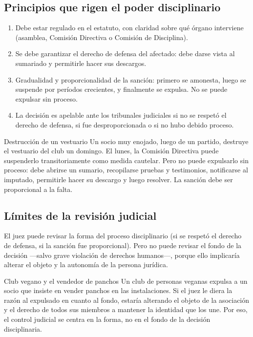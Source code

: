 \documentclass[12pt,oneside]{book}
\begin{document}
\subsection{Principios que rigen el poder disciplinario}

\begin{enumerate}
    \item Debe estar regulado en el estatuto, con claridad sobre qué órgano interviene (asamblea, Comisión Directiva o Comisión de Disciplina).
    \item Se debe garantizar el derecho de defensa del afectado: debe darse vista al sumariado y permitirle hacer sus descargos.
    \item Gradualidad y proporcionalidad de la sanción: primero se amonesta, luego se suspende por períodos crecientes, y finalmente se expulsa. No se puede expulsar sin proceso.
    \item La decisión es apelable ante los tribunales judiciales si no se respetó el derecho de defensa, si fue desproporcionada o si no hubo debido proceso.
\end{enumerate}

\begin{example}{Destrucción de un vestuario}
Un socio muy enojado, luego de un partido, destruye el vestuario del club un domingo. El lunes, la Comisión Directiva puede suspenderlo transitoriamente como medida cautelar. Pero no puede expulsarlo sin proceso: debe abrirse un sumario, recopilarse pruebas y testimonios, notificarse al imputado, permitirle hacer su descargo y luego resolver. La sanción debe ser proporcional a la falta.
\end{example}

\subsection{Límites de la revisión judicial}

El juez puede revisar la forma del proceso disciplinario (si se respetó el derecho de defensa, si la sanción fue proporcional). Pero no puede revisar el fondo de la decisión —salvo grave violación de derechos humanos—, porque ello implicaría alterar el objeto y la autonomía de la persona jurídica.

\begin{example}{Club vegano y el vendedor de panchos}
Un club de personas veganas expulsa a un socio que insiste en vender panchos en las instalaciones. Si el juez le diera la razón al expulsado en cuanto al fondo, estaría alterando el objeto de la asociación y el derecho de todos sus miembros a mantener la identidad que los une. Por eso, el control judicial se centra en la forma, no en el fondo de la decisión disciplinaria.
\end{example}
\end{document}
